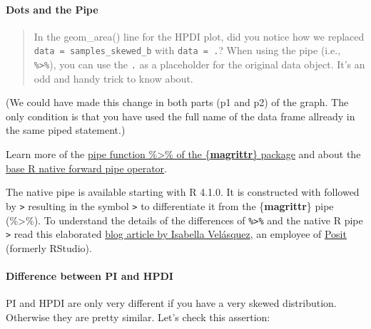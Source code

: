\documentclass[
  letterpaper,
  DIV=11,
  numbers=noendperiod]{scrreprt}
\let\oldparagraph\paragraph
\renewcommand{\paragraph}[1]{\oldparagraph{#1}\mbox{}}
\begin{document}
\hypertarget{dots-and-the-pipe}{%
\paragraph{Dots and the Pipe}\label{dots-and-the-pipe}}

\begin{quote}
In the geom\_area() line for the HPDI plot, did you notice how we
replaced \texttt{data\ =\ samples\_skewed\_b} with \texttt{data\ =\ .}?
When using the pipe (i.e., \texttt{\%\textgreater{}\%}), you can use the
\texttt{.} as a placeholder for the original data object. It's an odd
and handy trick to know about.
\end{quote}

(We could have made this change in both parts (p1 and p2) of the graph.
The only condition is that you have used the full name of the data frame
allready in the same piped statement.)

Learn more of the
\href{https://magrittr.tidyverse.org/reference/pipe.html}{pipe function
\%\textgreater\% of the \{\textbf{magrittr}\} package} and about the
\href{https://stat.ethz.ch/R-manual/R-devel/library/base/html/pipeOp.html}{base
R native forward pipe operator}.

The native pipe is available starting with R 4.1.0. It is constructed
with \texttt{\textbar{}} followed by \texttt{\textgreater{}} resulting
in the symbol \texttt{\textbar{}\textgreater{}} to differentiate it from
the \{\textbf{magrittr}\} pipe (\%\textgreater\%). To understand the
details of the differences of \texttt{\%\textgreater{}\%} and the native
R pipe \texttt{\textbar{}\textgreater{}} read this elaborated
\href{https://ivelasq.rbind.io/blog/understanding-the-r-pipe/index.html}{blog
article by Isabella Velásquez}, an employee of
\href{https://posit.co/}{Posit} (formerly RStudio).

\hypertarget{difference-between-pi-and-hpdi}{%
\paragraph{Difference between PI and
HPDI}\label{difference-between-pi-and-hpdi}}

PI and HPDI are only very different if you have a very skewed
distribution. Otherwise they are pretty similar. Let's check this
assertion:
\end{document}
